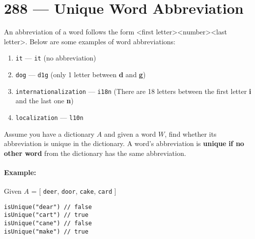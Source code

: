 \section{288 --- Unique Word Abbreviation}
An abbreviation of a word follows the form <first letter><number><last letter>. Below are some examples of word abbreviations:
\begin{enumerate}
\item \texttt{it} --- \texttt{it} (no abbreviation)
\item \texttt{dog} --- \texttt{d1g} (only 1 letter between \textbf{d} and \textbf{g})
\item \texttt{internationalization} --- \texttt{i18n} (There are 18 letters between the first letter \textbf{i} and the last one \textbf{n})
\item  \texttt{localization}  --- \texttt{l10n}
\end{enumerate}
Assume you have a dictionary $A$ and given a word $W$, find whether its abbreviation is unique in the dictionary. A word's abbreviation is \textbf{unique} \textbf{if no other word} from the dictionary has the same abbreviation.

\paragraph{Example: }

Given $A$ = [ \texttt{deer}, \texttt{door}, \texttt{cake}, \texttt{card} ]

\begin{lstlisting}[style=customc]
isUnique("dear") // false
isUnique("cart") // true
isUnique("cane") // false
isUnique("make") // true
\end{lstlisting}
